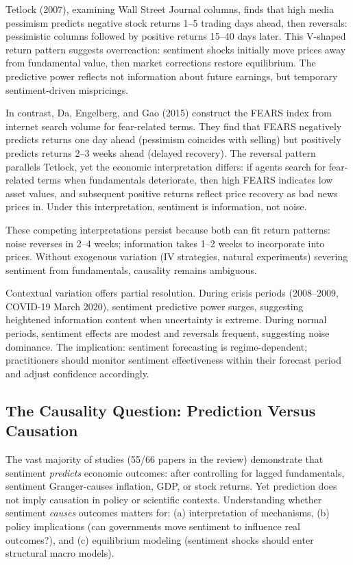 \documentclass[11pt,twocolumn]{article}
\begin{document}
Tetlock (2007), examining Wall Street Journal columns, finds that high media pessimism predicts negative stock returns 1--5 trading days ahead, then reversals: pessimistic columns followed by positive returns 15--40 days later. This V-shaped return pattern suggests overreaction: sentiment shocks initially move prices away from fundamental value, then market corrections restore equilibrium. The predictive power reflects not information about future earnings, but temporary sentiment-driven mispricings.

In contrast, Da, Engelberg, and Gao (2015) construct the FEARS index from internet search volume for fear-related terms. They find that FEARS negatively predicts returns one day ahead (pessimism coincides with selling) but positively predicts returns 2--3 weeks ahead (delayed recovery). The reversal pattern parallels Tetlock, yet the economic interpretation differs: if agents search for fear-related terms when fundamentals deteriorate, then high FEARS indicates low asset values, and subsequent positive returns reflect price recovery as bad news prices in. Under this interpretation, sentiment is information, not noise.

These competing interpretations persist because both can fit return patterns: noise reverses in 2--4 weeks; information takes 1--2 weeks to incorporate into prices. Without exogenous variation (IV strategies, natural experiments) severing sentiment from fundamentals, causality remains ambiguous.

Contextual variation offers partial resolution. During crisis periods (2008--2009, COVID-19 March 2020), sentiment predictive power surges, suggesting heightened information content when uncertainty is extreme. During normal periods, sentiment effects are modest and reversals frequent, suggesting noise dominance. The implication: sentiment forecasting is regime-dependent; practitioners should monitor sentiment effectiveness within their forecast period and adjust confidence accordingly.

\subsection{The Causality Question: Prediction Versus Causation}

The vast majority of studies (55/66 papers in the review) demonstrate that sentiment \emph{predicts} economic outcomes: after controlling for lagged fundamentals, sentiment Granger-causes inflation, GDP, or stock returns. Yet prediction does not imply causation in policy or scientific contexts. Understanding whether sentiment \emph{causes} outcomes matters for: (a) interpretation of mechanisms, (b) policy implications (can governments move sentiment to influence real outcomes?), and (c) equilibrium modeling (sentiment shocks should enter structural macro models).
\end{document}
